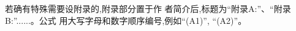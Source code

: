 \documentclass[10.5pt,twocolumn]{aaas}
\begin{document}
\renewcommand\refname{\hei\wuhao\centerline{参\quad 考\quad 文\quad 献（20条以上）}\global\def\refname{参考文献}}
\vskip 12pt

\let\OLDthebibliography\thebibliography
\renewcommand\thebibliography[1]{
  \OLDthebibliography{#1}
  \setlength{\parskip}{0pt}
  \setlength{\itemsep}{0pt plus 0.3ex}
}

{
\renewcommand{\baselinestretch}{0.9}
\liuhao


}



% 
% 
% 


\vskip 20pt
 
 
若确有特殊需要设附录的,附录部分置于作
者简介后,标题为“附录A:”、“附录B:”......。公式
用大写字母和数字顺序编号,例如“(A1)”, “(A2)”。





\newpage
\end{document}
